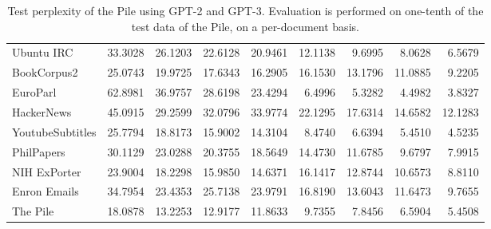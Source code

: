 \documentclass[11pt,a4paper]{article}
\begin{document}
\begin{appendices}
\begin{table*}[p]
{\begin{tabular}{l rrrr rrrr}
    Ubuntu IRC & 33.3028 & 26.1203 & 22.6128 & 20.9461 & 12.1138 & 9.6995 & 8.0628 & 6.5679 \\
    BookCorpus2 & 25.0743 & 19.9725 & 17.6343 & 16.2905 & 16.1530 & 13.1796 & 11.0885 & 9.2205 \\
    EuroParl & 62.8981 & 36.9757 & 28.6198 & 23.4294 & 6.4996 & 5.3282 & 4.4982 & 3.8327 \\
    HackerNews & 45.0915 & 29.2599 & 32.0796 & 33.9774 & 22.1295 & 17.6314 & 14.6582 & 12.1283 \\
    YoutubeSubtitles & 25.7794 & 18.8173 & 15.9002 & 14.3104 & 8.4740 & 6.6394 & 5.4510 & 4.5235 \\
    PhilPapers & 30.1129 & 23.0288 & 20.3755 & 18.5649 & 14.4730 & 11.6785 & 9.6797 & 7.9915 \\
    NIH ExPorter & 23.9004 & 18.2298 & 15.9850 & 14.6371 & 16.1417 & 12.8744 & 10.6573 & 8.8110 \\
    Enron Emails & 34.7954 & 23.4353 & 25.7138 & 23.9791 & 16.8190 & 13.6043 & 11.6473 & 9.7655 \\
    \midrule
    The Pile & 18.0878 & 13.2253 & 12.9177 & 11.8633 & 9.7355 & 7.8456 & 6.5904 & 5.4508 \\
        \bottomrule
    \end{tabular}
}
\caption{Test perplexity of the Pile using GPT-2 and GPT-3. Evaluation is performed on one-tenth of the test data of the Pile, on a per-document basis.}
\label{table:pile_perplexity}
\end{table*}



\end{appendices}
\end{document}
